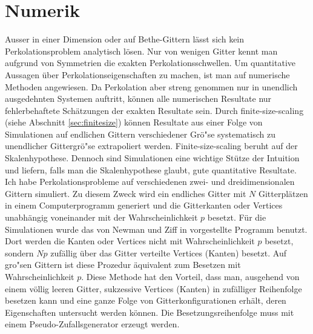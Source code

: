 \chapter{Numerik}
\label{sec:numerik}

Ausser in einer Dimension oder auf Bethe-Gittern l\"asst sich kein Perkolationsproblem analytisch l\"osen. Nur von wenigen Gitter kennt man aufgrund von Symmetrien die exakten Perkolationsschwellen. Um quantitative Aussagen \"uber Perkolationseigenschaften zu machen, ist man auf numerische Methoden angewiesen. Da Perkolation aber streng genommen nur in unendlich ausgedehnten Systemen auftritt, k\"onnen alle numerischen Resultate nur fehlerbehaftete Sch\"atzungen der exakten Resultate sein. Durch finite-size-scaling (siehe Abschnitt \ref{sec:finitesize}) k\"onnen Resultate aus einer Folge von Simulationen auf endlichen Gittern verschiedener Gr\"o"se systematisch zu unendlicher Gittergr\"o"se extrapoliert werden. Finite-size-scaling beruht auf der Skalenhypothese. Dennoch sind Simulationen eine wichtige St\"utze der Intuition und liefern, falls man die Skalenhypothese glaubt, gute quantitative Resultate.\\
Ich habe Perkolationsprobleme auf verschiedenen zwei- und dreidimensionalen Gittern simuliert. Zu diesem Zweck wird ein endliches Gitter mit $N$ Gitterpl\"atzen in einem Computerprogramm generiert und die Gitterkanten oder Vertices unabh\"angig voneinander mit der Wahrscheinlichkeit $p$ besetzt. F\"ur die Simulationen wurde das von Newman und Ziff in \cite{Newman:01} vorgestellte Programm benutzt. Dort werden die Kanten oder Vertices nicht mit Wahrscheinlichkeit $p$ besetzt, sondern $Np$ zuf\"allig \"uber das Gitter verteilte Vertices (Kanten) besetzt. Auf gro"sen Gittern ist diese Prozedur \"aquivalent zum Besetzen mit Wahrscheinlichkeit $p$. Diese Methode hat den Vorteil, dass man, ausgehend von einem v\"ollig leeren Gitter, sukzessive Vertices (Kanten) in zuf\"alliger Reihenfolge besetzen kann und eine ganze Folge von Gitterkonfigurationen erh\"alt, deren Eigenschaften untersucht werden k\"onnen. Die Besetzungsreihenfolge muss mit einem Pseudo-Zufallsgenerator erzeugt werden.

